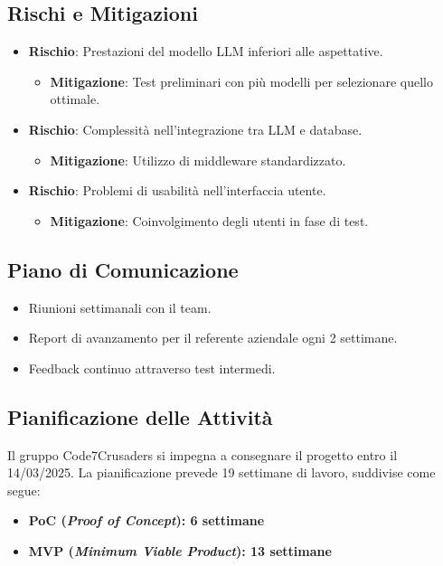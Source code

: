 \documentclass{article}
\begin{document}
    \subsection{Rischi e Mitigazioni}
    \begin{itemize}
        \item \textbf{Rischio}: Prestazioni del modello LLM inferiori alle aspettative.
        \begin{itemize}
            \item \textbf{Mitigazione}: Test preliminari con più modelli per selezionare quello ottimale.
        \end{itemize}
        \item \textbf{Rischio}: Complessità nell'integrazione tra LLM e database.
        \begin{itemize}
            \item \textbf{Mitigazione}: Utilizzo di middleware standardizzato.
        \end{itemize}
        \item \textbf{Rischio}: Problemi di usabilità nell'interfaccia utente.
        \begin{itemize}
            \item \textbf{Mitigazione}: Coinvolgimento degli utenti in fase di test.
        \end{itemize}
    \end{itemize}

    \subsection{Piano di Comunicazione}
    \begin{itemize}
        \item Riunioni settimanali con il team.
        \item Report di avanzamento per il referente aziendale ogni 2 settimane.
        \item Feedback continuo attraverso test intermedi.
    \end{itemize}

    \subsection{Pianificazione delle Attività}
        Il gruppo Code7Crusaders 
        si impegna a consegnare il progetto entro il 14/03/2025. La pianificazione prevede 
        19 settimane di lavoro, suddivise come segue:
        \begin{itemize}
            \item \textbf{PoC (\textit{Proof of Concept}): 6 settimane}
            \item \textbf{MVP (\textit{Minimum Viable Product}): 13 settimane}
        \end{itemize}
\end{document}
